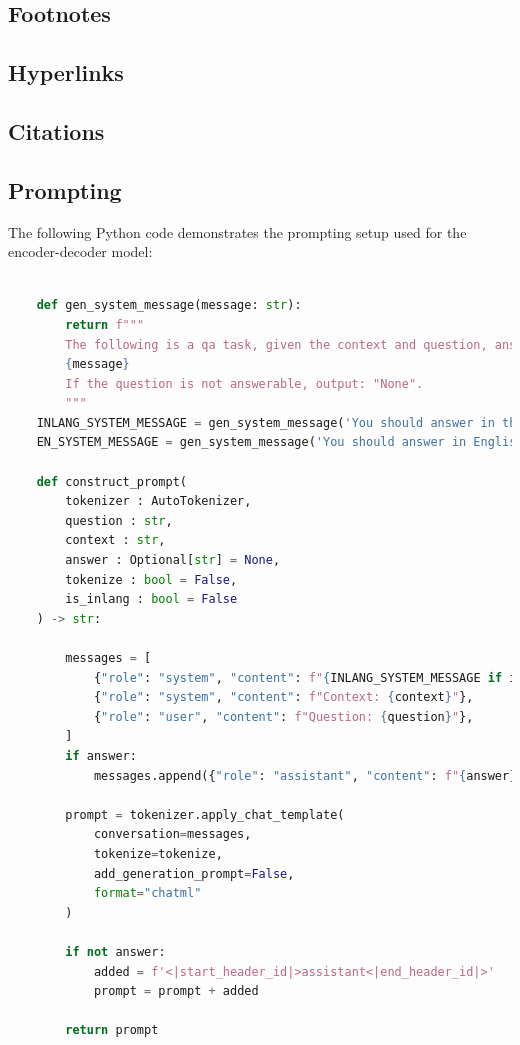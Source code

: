 \documentclass[11pt]{article}
\begin{document}
\subsection{Footnotes}

\subsection{Hyperlinks}
\subsection{Citations}


\appendix


\subsection{Prompting}
\label{sec:prompting}
The following Python code demonstrates the prompting setup used for the encoder-decoder model:

\begin{lstlisting}[language=Python]

    def gen_system_message(message: str):
        return f"""
        The following is a qa task, given the context and question, answer the question.The answer will be in the context.
        {message}
        If the question is not answerable, output: "None".
        """
    INLANG_SYSTEM_MESSAGE = gen_system_message('You should answer in the same language as the question.')
    EN_SYSTEM_MESSAGE = gen_system_message('You should answer in English.')
    
    def construct_prompt(
        tokenizer : AutoTokenizer,
        question : str,
        context : str,
        answer : Optional[str] = None,
        tokenize : bool = False,
        is_inlang : bool = False
    ) -> str:
        
        messages = [
            {"role": "system", "content": f"{INLANG_SYSTEM_MESSAGE if is_inlang else EN_SYSTEM_MESSAGE}"},
            {"role": "system", "content": f"Context: {context}"},
            {"role": "user", "content": f"Question: {question}"},
        ]
        if answer:
            messages.append({"role": "assistant", "content": f"{answer}"})
    
        prompt = tokenizer.apply_chat_template(
            conversation=messages, 
            tokenize=tokenize, 
            add_generation_prompt=False, 
            format="chatml"
        )
        
        if not answer:
            added = f'<|start_header_id|>assistant<|end_header_id|>'
            prompt = prompt + added
            
        return prompt
\end{lstlisting}
\end{document}
